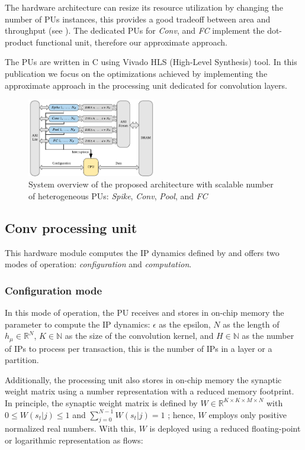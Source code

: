 The hardware architecture can resize its resource utilization by changing the number of PUs instances, this provides a good tradeoff between area and throughput (see ). The dedicated PUs for \emph{Conv}, and \emph{FC} implement the dot-product functional unit, therefore our approximate approach.

The PUs are written in C using Vivado HLS (High-Level Synthesis) tool. In this publication we focus on the optimizations achieved by implementing the approximate approach in the processing unit dedicated for convolution layers.

\begin{figure}
	\centering
	\includegraphics[width=0.5\textwidth]{../figures/sbs_hw.pdf}
	\caption{System overview of the proposed architecture with scalable number of heterogeneous PUs: \emph{Spike}, \emph{Conv}, \emph{Pool}, and \emph{FC}}
	\label{fig:hw_sbs}
\end{figure}

\subsection{Conv processing unit}
This hardware module computes the IP dynamics defined by  and offers two modes of operation: \emph{configuration} and \emph{computation}.

\subsubsection{Configuration mode}
In this mode of operation, the PU receives and stores in on-chip memory the parameter to compute the IP dynamics: $\epsilon$ as the epsilon, $N$ as the length of $h_\mu\in\mathbb{R}^{N}$, $K\in\mathbb{N}$ as the size of the convolution kernel, and $H\in\mathbb{N}$ as the number of IPs to process per transaction, this is the number of IPs in a layer or a partition.

Additionally, the processing unit also stores in on-chip memory the synaptic weight matrix using a number representation with a reduced memory footprint. In principle, the synaptic weight matrix is defined by $W\in\mathbb{R}^{K\times K\times M\times N}$ with $0\le W(s_t|j)\le1$ and $\sum_{j=0}^{N-1}W(s_t|j)=1$ \cite{rotermund2019Backpropagation}; hence, $W$ employs only positive normalized real numbers. With this, $W$ is deployed using a reduced floating-point or logarithmic representation as flows:

